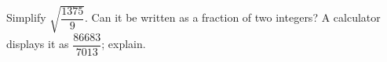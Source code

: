 Simplify $\sqrt{\dfrac{1375}{9}}$. Can it be written as a fraction of two integers? A calculator displays it as $\dfrac{86683}{7013}$; explain.
